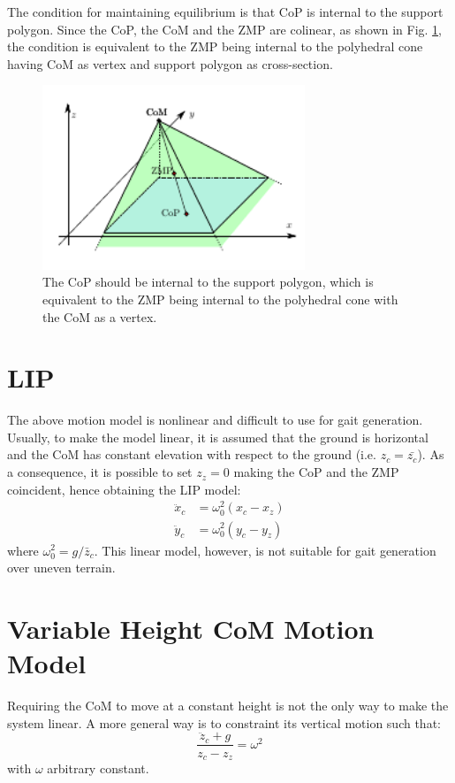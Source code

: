 The condition for maintaining equilibrium is that CoP is internal to the 
support polygon. Since the CoP, the CoM and the ZMP are colinear, as shown in 
Fig. \ref{fig:balance3d}, the condition is equivalent to the ZMP being internal
to the polyhedral cone having CoM as vertex and support
polygon as cross-section.
\begin{figure}
    \centering
    \includegraphics[width=0.7\textwidth]{figures/balance3d.pdf}
    \caption{The CoP should be internal to the support polygon, which is 
        equivalent to the ZMP being internal to the polyhedral cone with 
        the CoM as a vertex.}
    \label{fig:balance3d}
\end{figure}

\section{LIP}
The above motion model is nonlinear and difficult to use for gait generation.
Usually, to make the model linear, it is assumed that the ground is horizontal 
and the CoM has constant elevation with respect to the ground (i.e.
$z_c=\bar{z_c}$). As a consequence, it is possible to set $z_z=0$ making the 
CoP and the ZMP coincident, hence obtaining the LIP model:
\begin{align}
  \ddot{x}_c &= \omega_0^2 (x_c - x_z) \label{eq:lipm-x} \\
  \ddot{y}_c &= \omega_0^2 (y_c - y_z) \label{eq:lipm-y}
\end{align}
where $\omega_0^2 = g/\bar{z}_c$. This linear model, however, is not suitable 
for gait generation over uneven terrain.

\section{Variable Height CoM Motion Model}
Requiring the CoM to move at a constant height is not the only way to make the 
system linear. A more general way is to constraint its vertical motion such
that:
\begin{equation}
  \frac{\ddot{z}_c + g}{z_c - z_z} = \omega^2
\end{equation}
with $\omega$ arbitrary constant.

